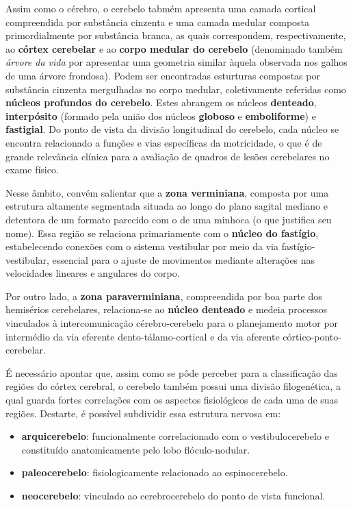 \documentclass[
]{book}
\providecommand{\tightlist}{%
  \setlength{\itemsep}{0pt}\setlength{\parskip}{0pt}}
\theoremstyle{definition}
\theoremstyle{definition}
\theoremstyle{definition}
\theoremstyle{definition}
\theoremstyle{remark}
\begin{document}
Assim como o cérebro, o cerebelo tabmém apresenta uma camada cortical compreendida por substância cinzenta e uma camada medular composta primordialmente por substância branca, as quais correspondem, respectivamente, ao \textbf{córtex cerebelar} e ao \textbf{corpo medular do cerebelo} (denominado também \emph{árvore da vida} por apresentar uma geometria similar àquela observada nos galhos de uma árvore frondosa). Podem ser encontradas esturturas compostas por substância cinzenta mergulhadas no corpo medular, coletivamente referidas como \textbf{núcleos profundos do cerebelo}. Estes abrangem os núcleos \textbf{denteado}, \textbf{interpósito} (formado pela união dos núcleos \textbf{globoso} e \textbf{emboliforme}) e \textbf{fastigial}. Do ponto de vista da divisão longitudinal do cerebelo, cada núcleo se encontra relacionado a funções e vias específicas da motricidade, o que é de grande relevância clínica para a avaliação de quadros de lesões cerebelares no exame físico.

Nesse âmbito, convém salientar que a \textbf{zona verminiana}, composta por uma estrutura altamente segmentada situada ao longo do plano sagital mediano e detentora de um formato parecido com o de uma minhoca (o que justifica seu nome). Essa região se relaciona primariamente com o \textbf{núcleo do fastígio}, estabelecendo conexões com o sistema vestibular por meio da via fastígio-vestibular, essencial para o ajuste de movimentos mediante alterações nas velocidades lineares e angulares do corpo.

Por outro lado, a \textbf{zona paraverminiana}, compreendida por boa parte dos hemisérios cerebelares, relaciona-se ao \textbf{núcleo denteado} e medeia processos vinculados à intercomunicação cérebro-cerebelo para o planejamento motor por intermédio da via eferente dento-tálamo-cortical e da via aferente córtico-ponto-cerebelar.

É necessário apontar que, assim como se pôde perceber para a classificação das regiões do córtex cerebral, o cerebelo também possui uma divisão filogenética, a qual guarda fortes correlações com os aspectos fisiológicos de cada uma de suas regiões. Destarte, é possível subdividir essa estrutura nervosa em:

\begin{itemize}
\tightlist
\item
  \textbf{arquicerebelo}: funcionalmente correlacionado com o vestibulocerebelo e constituído anatomicamente pelo lobo flóculo-nodular.
\item
  \textbf{paleocerebelo}: fisiologicamente relacionado ao espinocerebelo.
\item
  \textbf{neocerebelo}: vinculado ao cerebrocerebelo do ponto de vista funcional.
\end{itemize}
\end{document}

